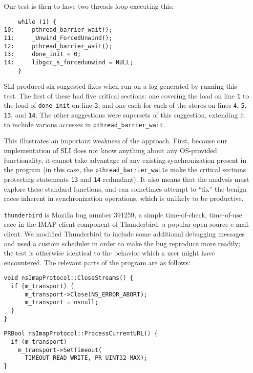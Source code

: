\documentclass[10pt,twocolumn,preprint,natbib,authoryear]{sigplanconf}
\begin{document}
Our test is then to have two threads loop executing this:

\begin{verbatim}
    while (1) {
10:     pthread_barrier_wait();
11:     _Unwind_ForcedUnwind();
12:     pthread_barrier_wait();
13:     done_init = 0;
14:     libgcc_s_forcedunwind = NULL;
    }
\end{verbatim}

SLI produced six suggested fixes when run on a log generated by
running this test.  The first of these had five critical sections: one
covering the load on line \verb|1| to the load of \verb|done_init| on
line \verb|3|, and one each for each of the stores on lines \verb|4|,
\verb|5|, \verb|13|, and \verb|14|.  The other suggestions were
supersets of this suggestion, extending it to include various accesses
in \verb|pthread_barrier_wait|.

This illustrates an important weakness of the approach.  First,
because our implementation of SLI does not know anything about any
OS-provided functionality, it cannot take advantage of any existing
synchronization present in the program (in this case, the
\verb|pthread_barrier_wait|s make the critical sections protecting
statements \verb|13| and \verb|14| redundant).  It also means that the
analysis must explore these standard functions, and can sometimes
attempt to ``fix'' the benign races inherent in synchronization
operations, which is unlikely to be productive.

\verb|thunderbird| is Mozilla bug number
391259\cite{thunderbird39125}, a simple time-of-check, time-of-use
race in the IMAP client component of Thunderbird, a popular
open-source e-mail client.  We modified Thunderbird to include some
additional debugging messages and used a custom scheduler in order to
make the bug reproduce more readily; the test is otherwise identical
to the behavior which a user might have encountered.  The relevant
parts of the program are as follows:

\begin{verbatim}
void nsImapProtocol::CloseStreams() {
  if (m_transport) {
      m_transport->Close(NS_ERROR_ABORT);
      m_transport = nsnull;
  }
}
\end{verbatim}

\begin{verbatim}
PRBool nsImapProtocol::ProcessCurrentURL() {
  if (m_transport)
    m_transport->SetTimeout(
      TIMEOUT_READ_WRITE, PR_UINT32_MAX);
}
\end{verbatim}
\end{document}
